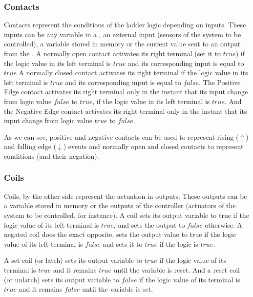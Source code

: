 \subsubsection{Contacts}
Contacts represent the conditions of the ladder logic depending on inputs. These inputs can be any variable in a
\PLC, an external input (sensors of the system to be controlled), a variable stored in memory or the current
value sent to an output from the \PLC. A normally open contact
activates its right terminal (set it to $true$) if the logic value in its left terminal
is $true$ and its corresponding input is equal to $true$ 
A normally closed contact activates its right terminal if the logic value in its
left terminal is $true$ and its corresponding input is equal to $false$.
The Positive Edge contact activates its right terminal only in the instant that
its input change from logic value $false$ to $true$, if the logic value in its
left terminal is $true$. And the Negative Edge contact activates its right
terminal only in the instant that its input change from logic value $true$ to
$false$.

As we can see, positive and negative contacts can be used to represent rising ($\uparrow$)
and falling edge ($\downarrow$) events and normally open and closed contacts
to represent conditions (and their negation).

\subsubsection{Coils}

Coils, by the other side represent the actuation in outputs. These
outputs can be a variable stored in memory or the outputs
of the controller (actuators of the system to be controlled, for instance). 
A coil sets its output variable to true if the logic value of its left terminal is $true$,
and sets the output to $false$ otherwise.
A negated coil does the exact opposite, sets the output value to true if the logic
value of its left terminal is $false$ and sets it to $true$ if the logic is
$true$.

A set coil (or latch) sets its output variable to $true$ if the logic value of its
terminal is $true$ and it remains $true$ until the variable is reset.
And a reset coil (or unlatch) sets its output variable to $false$ if the logic
value of its terminal is $true$ and it remains $false$ until the variable is
set.

